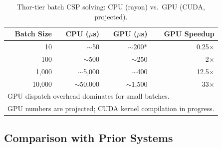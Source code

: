 \documentclass[sigplan,10pt,review]{acmart}
\begin{document}
\begin{table}[h]
\centering
\caption{Thor-tier batch CSP solving: CPU (rayon) vs.\ GPU (CUDA, projected).}
\label{tab:gpu}
\renewcommand{\arraystretch}{1.2}
\begin{tabular}{rrrr}
\toprule
\textbf{Batch Size} & \textbf{CPU ($\mu$s)} & \textbf{GPU ($\mu$s)} & \textbf{GPU Speedup} \\
\midrule
10      & $\sim$50   & $\sim$200* & 0.25$\times$ \\
100     & $\sim$500  & $\sim$250  & 2$\times$ \\
1,000   & $\sim$5,000 & $\sim$400 & 12.5$\times$ \\
10,000  & $\sim$50,000 & $\sim$1,500 & 33$\times$ \\
\bottomrule
\multicolumn{4}{l}{\footnotesize *GPU dispatch overhead dominates for small batches.} \\
\multicolumn{4}{l}{\footnotesize GPU numbers are projected; CUDA kernel compilation in progress.}
\end{tabular}
\end{table}

\subsection{Comparison with Prior Systems}
\end{document}
